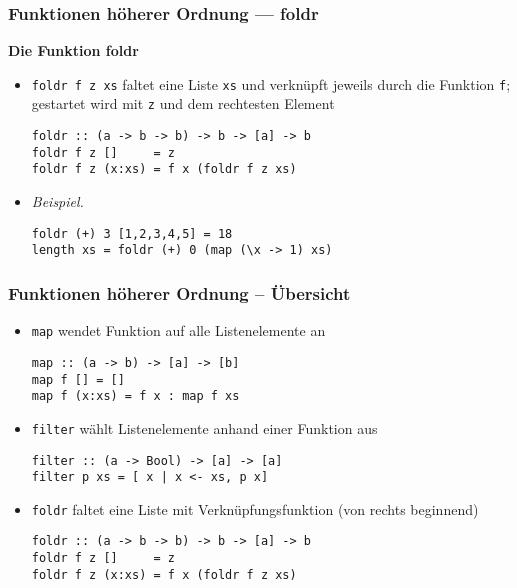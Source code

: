 \documentclass{beamer}
\begin{document}
\begin{frame}[fragile] \frametitle{Funktionen höherer Ordnung --- foldr}
	\footnotesize
	\textbf{Die Funktion foldr}
	\begin{itemize}
		\item \texttt{foldr f z xs} faltet eine Liste \texttt{xs} und verknüpft jeweils durch die Funktion \texttt{f}; gestartet wird mit \texttt{z} und dem rechtesten Element \\[6pt]
		\begin{lstlisting}[style=bg]
foldr :: (a -> b -> b) -> b -> [a] -> b
foldr f z []     = z 
foldr f z (x:xs) = f x (foldr f z xs) 
		\end{lstlisting}
		\item \emph{Beispiel.} \\[6pt]
		\begin{lstlisting}[style=bg]
foldr (+) 3 [1,2,3,4,5] = 18
length xs = foldr (+) 0 (map (\x -> 1) xs)
		\end{lstlisting}
	\end{itemize}
\end{frame}


\begin{frame}[fragile] \frametitle{Funktionen höherer Ordnung -- Übersicht}
	\footnotesize
	\begin{itemize}
		\item \texttt{map} wendet Funktion auf alle Listenelemente an \\[6pt]
		\begin{lstlisting}[style=bg]
map :: (a -> b) -> [a] -> [b]
map f [] = []
map f (x:xs) = f x : map f xs
		\end{lstlisting}
		\item \texttt{filter} wählt Listenelemente anhand einer Funktion aus \\[6pt]
		\begin{lstlisting}[style=bg]
filter :: (a -> Bool) -> [a] -> [a]
filter p xs = [ x | x <- xs, p x]
		\end{lstlisting}
		\item \texttt{foldr} faltet eine Liste mit Verknüpfungsfunktion (von rechts beginnend) \\[6pt]
		\begin{lstlisting}[style=bg]
foldr :: (a -> b -> b) -> b -> [a] -> b
foldr f z []     = z
foldr f z (x:xs) = f x (foldr f z xs) 
		\end{lstlisting}
	\end{itemize}
\end{frame}
\end{document}
